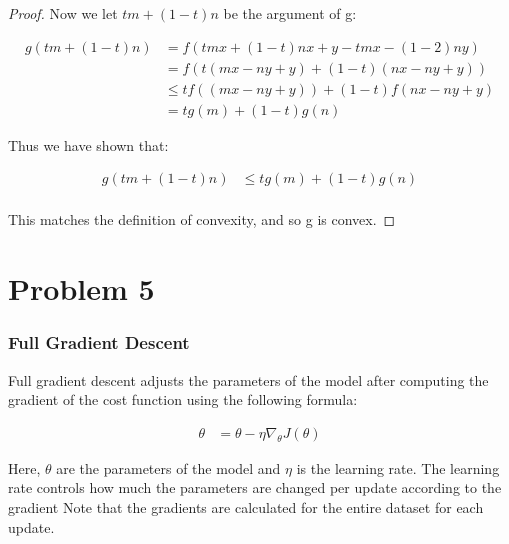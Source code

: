 \documentclass[twoside,11pt]{homework}
\begin{document}
\begin{proof}
Now we let $tm+(1-t)n$ be the argument of g:

\begin{align*}
	g(tm+(1-t)n)&= f(tmx+(1-t)nx+y-tmx-(1-2)ny)\\
	&= f(t(mx-ny+y)+(1-t)(nx-ny+y))\\
	&\leq tf((mx-ny+y))+(1-t)f(nx-ny+y)\\
	&=tg(m)+(1-t)g(n)
\end{align*}

Thus we have shown that:

\begin{align*}
	g(tm+(1-t)n)&\leq tg(m)+(1-t)g(n)\\
\end{align*}

This matches the definition of convexity, and so g is convex.
\end{proof}
\section{Problem 5}
\subsubsection{Full Gradient Descent}

Full gradient descent adjusts the parameters of the model after computing the gradient of the cost function using the following formula:

\begin{align*}
	\theta &= \theta - \eta \nabla_\theta J(\theta)
\end{align*}

Here, $\theta$ are the parameters of the model and $\eta$ is the learning rate. The learning rate controls how much the parameters are changed per update according to the gradient Note that the gradients are calculated for the entire dataset for each update.
\end{document}
